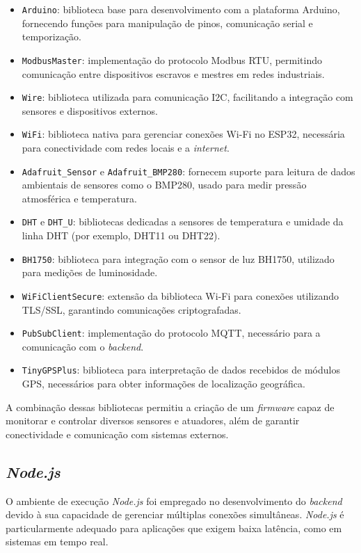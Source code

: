 \begin{itemize}
    \item \texttt{Arduino}: biblioteca base para desenvolvimento com a plataforma Arduino, fornecendo funções para manipulação de pinos, comunicação serial e temporização.
    \item \texttt{ModbusMaster}: implementação do protocolo Modbus RTU, permitindo comunicação entre dispositivos escravos e mestres em redes industriais.
    \item \texttt{Wire}: biblioteca utilizada para comunicação I2C, facilitando a integração com sensores e dispositivos externos.
    \item \texttt{WiFi}: biblioteca nativa para gerenciar conexões Wi-Fi no ESP32, necessária para conectividade com redes locais e a \textit{internet}.
    \item \texttt{Adafruit\_Sensor} e \texttt{Adafruit\_BMP280}: fornecem suporte para leitura de dados ambientais de sensores como o BMP280, usado para medir pressão atmosférica e temperatura.
    \item \texttt{DHT} e \texttt{DHT\_U}: bibliotecas dedicadas a sensores de temperatura e umidade da linha DHT (por exemplo, DHT11 ou DHT22).
    \item \texttt{BH1750}: biblioteca para integração com o sensor de luz BH1750, utilizado para medições de luminosidade.
    \item \texttt{WiFiClientSecure}: extensão da biblioteca Wi-Fi para conexões utilizando TLS/SSL, garantindo comunicações criptografadas.
    \item \texttt{PubSubClient}: implementação do protocolo MQTT, necessário para a comunicação com o \textit{backend}.
    \item \texttt{TinyGPSPlus}: biblioteca para interpretação de dados recebidos de módulos GPS, necessários para obter informações de localização geográfica.
\end{itemize}

A combinação dessas bibliotecas permitiu a criação de um \textit{firmware} capaz de monitorar e controlar diversos sensores e atuadores, além de garantir conectividade e comunicação com sistemas externos.

\subsection{\textit{Node.js}}
O ambiente de execução \textit{Node.js} foi empregado no desenvolvimento do \textit{backend} devido à sua capacidade de gerenciar múltiplas conexões simultâneas. \textit{Node.js} é particularmente adequado para aplicações que exigem baixa latência, como em sistemas em tempo real.

